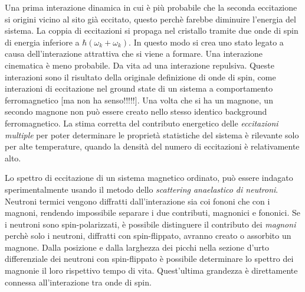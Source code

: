 Una prima interazione dinamica in cui \`e pi\`u probabile che la seconda eccitazione si origini vicino al sito gi\`a eccitato, questo perch\`e farebbe diminuire l'energia del sistema. La coppia di eccitazioni si propaga nel cristallo tramite due onde di spin di energia inferiore a $\hbar(\omega_k+\omega_k)$. In questo modo si crea uno stato legato a causa dell'interazione attrattiva che si viene a formare. Una interazione cinematica \`e meno probabile. Da vita ad una interazione repulsiva. Queste interazioni sono il risultato della originale definizione di onde di spin, come interazioni di eccitazione nel ground state di un sistema a comportamento ferromagnetico [ma non ha senso!!!!!]. Una volta che si ha un magnone, un secondo magnone non pu\`o essere creato nello stesso identico background ferromagnetico. La stima corretta del contributo energetico delle \textit{eccitazioni multiple} per poter determinare le propriet\`a statistiche del sistema \`e rilevante solo per alte temperature, quando la densit\`a del numero di eccitazioni \`e relativamente alto.

Lo spettro di eccitazione di un sistema magnetico ordinato, pu\`o essere indagato sperimentalmente usando il metodo dello \textit{scattering anaelastico di neutroni}. Neutroni termici vengono diffratti dall'interazione sia coi fononi che con i magnoni, rendendo impossibile separare i due contributi, magnonici e fononici. Se i neutroni sono spin-polarizzati, \`e possibile distinguere il contributo dei \textit{magnoni} perch\`e solo i neutroni, diffratti con spin-flippato, avranno creato o assorbito un magnone. Dalla posizione e dalla larghezza dei picchi nella sezione d'urto differenziale dei neutroni con spin-flippato \`e possibile determinare lo spettro dei magnonie il loro rispettivo tempo di vita. Quest'ultima grandezza \`e direttamente connessa all'interazione tra onde di spin.

